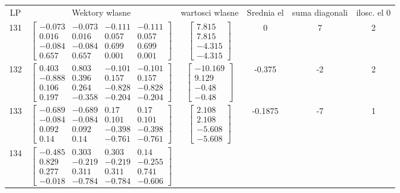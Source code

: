 \documentclass[a4paper,12pt]{article}
\begin{document}
\bgroup {} \vspace{0.2in} \begin{tabular}{c c c c c c}
LP &Wektory wlasne & wartosci wlasne & Srednia el & suma diagonali & ilosc. el 0\\
131
&
$\begin{bmatrix} -0.073 & -0.073 & -0.111 & -0.111 \\ 0.016 & 0.016 & 0.057 & 0.057 \\ -0.084 & -0.084 & 0.699 & 0.699 \\ 0.657 & 0.657 & 0.001 & 0.001 \end{bmatrix}$
&
$\begin{bmatrix} 7.815 \\ 7.815 \\ -4.315 \\ -4.315 \end{bmatrix}$
&
0
&
7
&
2
\\
132
&
$\begin{bmatrix} 0.403 & 0.803 & -0.101 & -0.101 \\ -0.888 & 0.396 & 0.157 & 0.157 \\ 0.106 & 0.264 & -0.828 & -0.828 \\ 0.197 & -0.358 & -0.204 & -0.204 \end{bmatrix}$
&
$\begin{bmatrix} -10.169 \\ 9.129 \\ -0.48 \\ -0.48 \end{bmatrix}$
&
-0.375
&
-2
&
2
\\
133
&
$\begin{bmatrix} -0.689 & -0.689 & 0.17 & 0.17 \\ -0.084 & -0.084 & 0.101 & 0.101 \\ 0.092 & 0.092 & -0.398 & -0.398 \\ 0.14 & 0.14 & -0.761 & -0.761 \end{bmatrix}$
&
$\begin{bmatrix} 2.108 \\ 2.108 \\ -5.608 \\ -5.608 \end{bmatrix}$
&
-0.1875
&
-7
&
1
\\
134
&
$\begin{bmatrix} -0.485 & 0.303 & 0.303 & 0.14 \\ 0.829 & -0.219 & -0.219 & -0.255 \\ 0.277 & 0.311 & 0.311 & 0.741 \\ -0.018 & -0.784 & -0.784 & -0.606 \end{bmatrix}$

\end{tabular}
\end{document}

